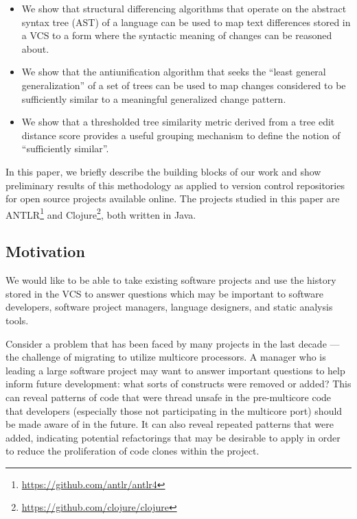 \begin{itemize}

\item We show that structural differencing algorithms that operate on the
abstract syntax tree (AST) of a language can be used to map text
differences stored in a VCS to a form where the syntactic meaning of changes
can be reasoned about.

\item We show that the antiunification algorithm that seeks the ``least general
generalization'' of a set of trees can be used to map changes considered to be
sufficiently similar to a meaningful generalized change pattern.

\item We show that a thresholded tree similarity metric derived from
a tree edit distance score provides a useful grouping mechanism to define
the notion of ``sufficiently similar''.

\end{itemize}

In this paper, we briefly describe the building blocks of our work and show
preliminary results of this methodology as applied to version control
repositories for open source projects available online.  The projects studied
in this paper are ANTLR\footnote{\url{https://github.com/antlr/antlr4}} and
Clojure\footnote{\url{https://github.com/clojure/clojure}}, both written in
Java.

\subsection{Motivation}
\label{sec:motivation}

We would like to be able to take existing software projects and use the history
stored in the VCS to answer questions which may be important to software
developers, software project managers, language designers, and static analysis
tools.

Consider a problem that has been faced by many projects in the last decade ---
the challenge of migrating to utilize multicore processors.  A manager who is
leading a large software project may want to answer important questions to
help inform future development: what sorts of constructs were removed or added?
This can reveal patterns of code that were thread unsafe in the pre-multicore
code that developers (especially those not participating in the multicore port)
should be made aware of in the future.  It can also reveal repeated patterns that
were added, indicating potential refactorings that may be desirable to apply
in order to reduce the proliferation of code clones within the project.

